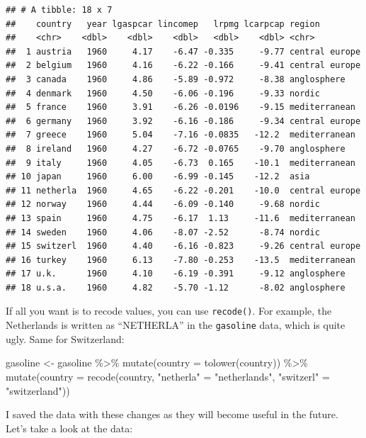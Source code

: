 \documentclass[
]{article}
\newenvironment{Shaded}{\begin{snugshade}}{\end{snugshade}}
\newcommand{\AttributeTok}[1]{\textcolor[rgb]{0.77,0.63,0.00}{#1}}
\newcommand{\FunctionTok}[1]{\textcolor[rgb]{0.00,0.00,0.00}{#1}}
\newcommand{\NormalTok}[1]{#1}
\newcommand{\OtherTok}[1]{\textcolor[rgb]{0.56,0.35,0.01}{#1}}
\newcommand{\SpecialCharTok}[1]{\textcolor[rgb]{0.00,0.00,0.00}{#1}}
\newcommand{\StringTok}[1]{\textcolor[rgb]{0.31,0.60,0.02}{#1}}
\begin{document}
\begin{verbatim}
## # A tibble: 18 x 7
##    country   year lgaspcar lincomep   lrpmg lcarpcap region        
##    <chr>    <dbl>    <dbl>    <dbl>   <dbl>    <dbl> <chr>         
##  1 austria   1960     4.17    -6.47 -0.335     -9.77 central europe
##  2 belgium   1960     4.16    -6.22 -0.166     -9.41 central europe
##  3 canada    1960     4.86    -5.89 -0.972     -8.38 anglosphere   
##  4 denmark   1960     4.50    -6.06 -0.196     -9.33 nordic        
##  5 france    1960     3.91    -6.26 -0.0196    -9.15 mediterranean 
##  6 germany   1960     3.92    -6.16 -0.186     -9.34 central europe
##  7 greece    1960     5.04    -7.16 -0.0835   -12.2  mediterranean 
##  8 ireland   1960     4.27    -6.72 -0.0765    -9.70 anglosphere   
##  9 italy     1960     4.05    -6.73  0.165    -10.1  mediterranean 
## 10 japan     1960     6.00    -6.99 -0.145    -12.2  asia          
## 11 netherla  1960     4.65    -6.22 -0.201    -10.0  central europe
## 12 norway    1960     4.44    -6.09 -0.140     -9.68 nordic        
## 13 spain     1960     4.75    -6.17  1.13     -11.6  mediterranean 
## 14 sweden    1960     4.06    -8.07 -2.52      -8.74 nordic        
## 15 switzerl  1960     4.40    -6.16 -0.823     -9.26 central europe
## 16 turkey    1960     6.13    -7.80 -0.253    -13.5  mediterranean 
## 17 u.k.      1960     4.10    -6.19 -0.391     -9.12 anglosphere   
## 18 u.s.a.    1960     4.82    -5.70 -1.12      -8.02 anglosphere
\end{verbatim}

If all you want is to recode values, you can use \texttt{recode()}. For example, the Netherlands is
written as ``NETHERLA'' in the \texttt{gasoline} data, which is quite ugly. Same for Switzerland:

\begin{Shaded}
\begin{Highlighting}[]
\NormalTok{gasoline }\OtherTok{\textless{}{-}}\NormalTok{ gasoline }\SpecialCharTok{\%\textgreater{}\%}
  \FunctionTok{mutate}\NormalTok{(}\AttributeTok{country =} \FunctionTok{tolower}\NormalTok{(country)) }\SpecialCharTok{\%\textgreater{}\%}
  \FunctionTok{mutate}\NormalTok{(}\AttributeTok{country =} \FunctionTok{recode}\NormalTok{(country, }\StringTok{"netherla"} \OtherTok{=} \StringTok{"netherlands"}\NormalTok{, }\StringTok{"switzerl"} \OtherTok{=} \StringTok{"switzerland"}\NormalTok{))}
\end{Highlighting}
\end{Shaded}

I saved the data with these changes as they will become useful in the future. Let's take a look at
the data:
\end{document}
